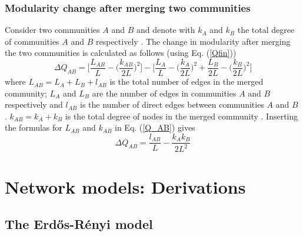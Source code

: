 \documentclass[11 pt , letterpaper , twoside , openright]{book}
\begin{document}
\subsection{Modularity change after merging two communities}\label{modchange}

Consider two communities $A$ and $B$ and denote with $k_A$ and $k_B$ the total degree of communities $A$ and $B$ respectively \cite{Albert2016}. The change in modularity after merging the two communities is calculated as follows (using Eq. (\ref{Qfin})) \cite{Albert2016}
\begin{equation}\label{Q_AB}
	\Delta Q_{AB} = \bigg[\frac{L_{AB}}{L} - \bigg(\frac{k_{AB}}{2L} \bigg)^2 \bigg] - \bigg[\frac{L_A}{L} - \bigg(\frac{k_A}{2L} \bigg)^2 + \frac{L_B}{2L} - \bigg(\frac{k_B}{2L} \bigg)^2 \bigg]
\end{equation}
where $L_{AB} = L_A + L_B + l_{AB}$ is the total number of edges in the merged community; $L_A$ and $L_B$ are the number of edges in communities $A$ and $B$ respectively and $l_{AB}$ is the number of direct edges between communities $A$ and $B$ \cite{Albert2016}. $k_{AB} = k_A + k_B$ is the total degree of nodes in the merged community \cite{Albert2016}. Inserting the formulas for $L_{AB}$ and $k_{AB}$ in Eq. (\ref{Q_AB}) gives
\begin{equation}
	\Delta Q_{AB} = \frac{l_{AB}}{L} - \frac{k_Ak_B}{2L^2}
\end{equation}

\chapter{Network models: Derivations}
\section{The Erd\H{o}s-R\'{e}nyi model}\label{ER}
\end{document}
